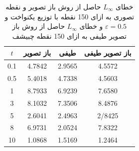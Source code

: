 \begin{table}[htp] 
\centering\caption{
خطای
$L_{\infty}$
حاصل از روش باز تصویر و نقطه تصوری به ازای 150 نقطه با توزیع یکنواخت و
$\varepsilon=0.5$
و خطای 
$L_{\infty}$
حاصل از روش باز تصویر طیفی به ازای 150 نقطه چبیشف
}
\label{tab:re1}
\renewcommand*{\arraystretch}{1.2}
\vspace*{.4cm}
\begin{tabular}{||c|c|c|c||}%
\hline
$t$ & باز تصویر &  طیفی  & باز تصویر طیفی   \\
\hline
0.1     & 4.7842   & 2.9565     & 4.5572        \\
  0.5        & 5.4018       & 4.7338    & 4.5603        \\
  1          & 8.7933      &6.9239     & 7.6580        \\
  3          & 8.1032       & 7.3506   & 8.4876       \\
  5          & 2.6041      &2.4963    & 2/8425        \\
  8          &6.9731     & 2.0524     & 7.8322       \\
  10         & 1.0868      & 1.5169     & 1.2464      \\
\hline
\end{tabular}
\end{table}
%
%
